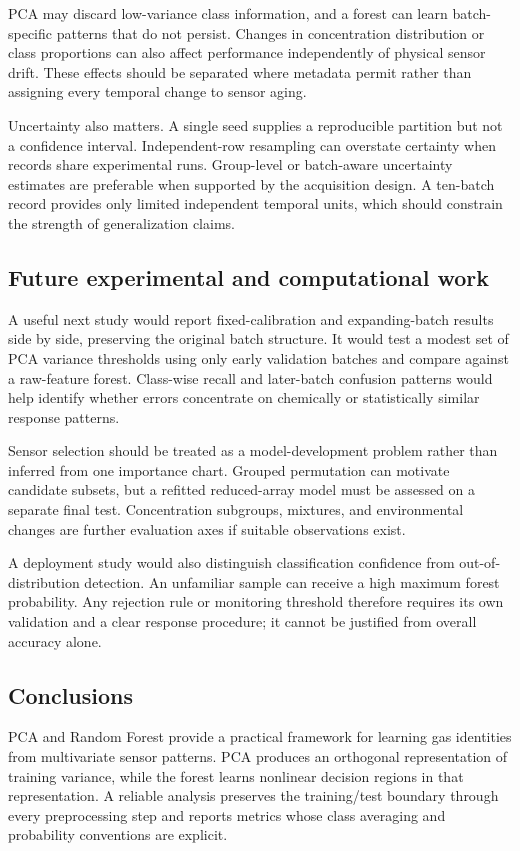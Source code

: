 \documentclass[11pt,a4paper]{article}
\begin{document}
PCA may discard low-variance class information, and a forest can learn batch-specific patterns that do not persist. Changes in concentration distribution or class proportions can also affect performance independently of physical sensor drift. These effects should be separated where metadata permit rather than assigning every temporal change to sensor aging.

Uncertainty also matters. A single seed supplies a reproducible partition but not a confidence interval. Independent-row resampling can overstate certainty when records share experimental runs. Group-level or batch-aware uncertainty estimates are preferable when supported by the acquisition design. A ten-batch record provides only limited independent temporal units, which should constrain the strength of generalization claims.

\subsection{Future experimental and computational work}
A useful next study would report fixed-calibration and expanding-batch results side by side, preserving the original batch structure. It would test a modest set of PCA variance thresholds using only early validation batches and compare against a raw-feature forest. Class-wise recall and later-batch confusion patterns would help identify whether errors concentrate on chemically or statistically similar response patterns.

Sensor selection should be treated as a model-development problem rather than inferred from one importance chart. Grouped permutation can motivate candidate subsets, but a refitted reduced-array model must be assessed on a separate final test. Concentration subgroups, mixtures, and environmental changes are further evaluation axes if suitable observations exist.

A deployment study would also distinguish classification confidence from out-of-distribution detection. An unfamiliar sample can receive a high maximum forest probability. Any rejection rule or monitoring threshold therefore requires its own validation and a clear response procedure; it cannot be justified from overall accuracy alone.

\subsection{Conclusions}
PCA and Random Forest provide a practical framework for learning gas identities from multivariate sensor patterns. PCA produces an orthogonal representation of training variance, while the forest learns nonlinear decision regions in that representation. A reliable analysis preserves the training/test boundary through every preprocessing step and reports metrics whose class averaging and probability conventions are explicit.
\end{document}
